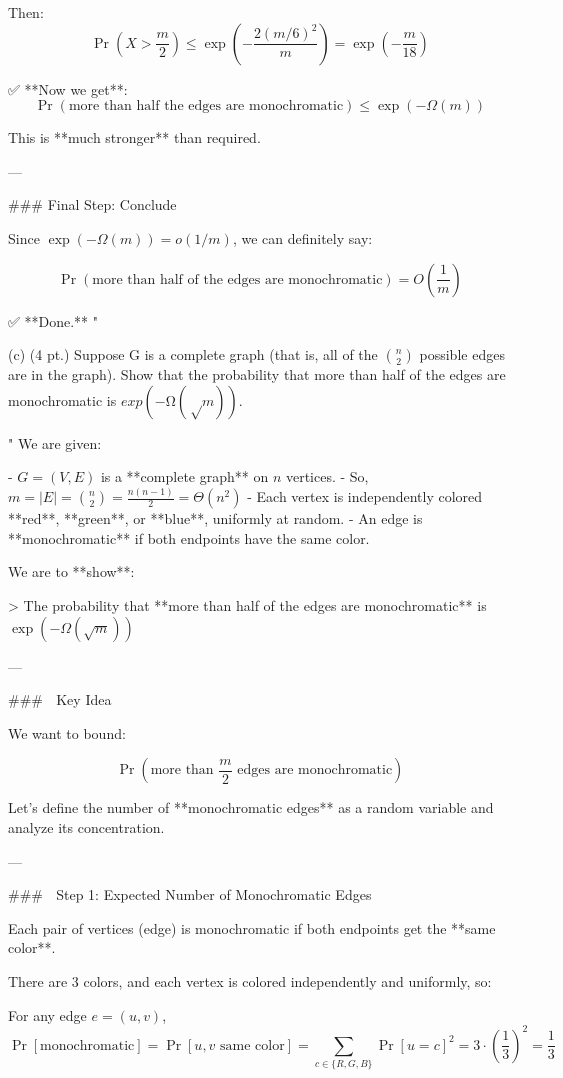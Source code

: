 Then:
\[
\Pr\left(X > \frac{m}{2}\right) \le \exp\left(-\frac{2(m/6)^2}{m}\right) = \exp\left(-\frac{m}{18}\right)
\]

✅ **Now we get**:
\[
\Pr\left(\text{more than half the edges are monochromatic}\right) \le \exp(-\Omega(m))
\]

This is **much stronger** than required.

---

### Final Step: Conclude

Since \( \exp(-\Omega(m)) = o(1/m) \), we can definitely say:

\[
\Pr(\text{more than half of the edges are monochromatic}) = O\left(\frac{1}{m}\right)
\]

✅ **Done.**
"

(c) (4 pt.) Suppose G is a complete graph (that is, all of the $\binom{n}{2}$ possible edges are in the graph). Show that the probability that more than half of the edges are monochromatic is $exp(-Ω(√m))$.

"
We are given:

- \( G = (V, E) \) is a **complete graph** on \( n \) vertices.
- So, \( m = |E| = \binom{n}{2} = \frac{n(n-1)}{2} = \Theta(n^2) \)
- Each vertex is independently colored **red**, **green**, or **blue**, uniformly at random.
- An edge is **monochromatic** if both endpoints have the same color.

We are to **show**:

> The probability that **more than half of the edges are monochromatic** is \( \exp(-\Omega(\sqrt{m})) \)

---

### 🧠 Key Idea

We want to bound:

\[
\Pr\left(\text{more than } \frac{m}{2} \text{ edges are monochromatic} \right)
\]

Let's define the number of **monochromatic edges** as a random variable and analyze its concentration.

---

### 🔢 Step 1: Expected Number of Monochromatic Edges

Each pair of vertices (edge) is monochromatic if both endpoints get the **same color**.

There are 3 colors, and each vertex is colored independently and uniformly, so:

For any edge \( e = (u, v) \),
\[
\Pr[\text{monochromatic}] = \Pr[u, v \text{ same color}] = \sum_{c \in \{R, G, B\}} \Pr[u = c]^2 = 3 \cdot \left(\frac{1}{3}\right)^2 = \frac{1}{3}
\]

